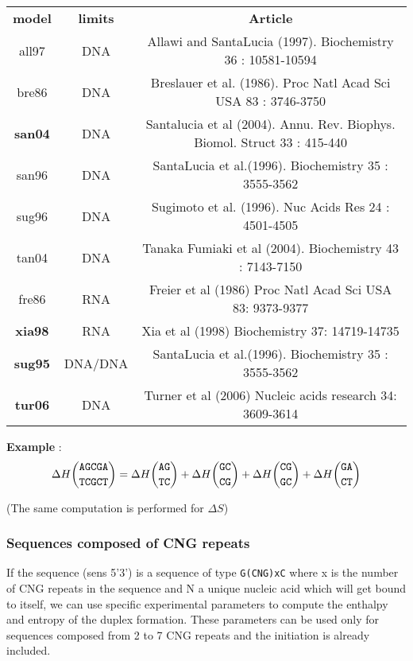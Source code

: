 \documentclass{article}
\begin{document}
\begin{table}[h]
\begin{tabular}[h]{| c | c | c |}
\textbf{model} & \textbf{limits} & \textbf{Article} \\
all97 & DNA & Allawi and SantaLucia (1997). Biochemistry 36 : 10581-10594 \\
bre86 & DNA & Breslauer et al. (1986). Proc Natl Acad Sci USA 83 : 3746-3750 \\
\textbf{san04} & DNA & Santalucia et al (2004). Annu. Rev. Biophys. Biomol. Struct 33 : 415-440 \\
san96 & DNA & SantaLucia et al.(1996). Biochemistry 35 : 3555-3562 \\
sug96 & DNA & Sugimoto et al. (1996). Nuc Acids Res 24 : 4501-4505 \\
tan04 & DNA & Tanaka Fumiaki et al (2004). Biochemistry 43 : 7143-7150  \\
fre86 & RNA & Freier et al (1986) Proc Natl Acad Sci USA 83: 9373-9377 \\
\textbf{xia98} & RNA & Xia et al (1998) Biochemistry 37: 14719-14735 \\
\textbf{sug95} & DNA/DNA & SantaLucia et al.(1996). Biochemistry 35 : 3555-3562 \\
\textbf{tur06} & DNA & Turner et al (2006) Nucleic acids research 34: 3609-3614 \\
\end{tabular}
\end{table}


\textbf{Example} :
\begin{multline*}
\Delta H {\mbox{\texttt{AGCGA}} \choose \mbox{\texttt{TCGCT}}} = 
\Delta H {\mbox{\texttt{AG}} \choose \mbox{\texttt{TC}} } + 
\Delta H {\mbox{\texttt{GC}} \choose \mbox{\texttt{CG}} } +
\Delta H {\mbox{\texttt{CG}} \choose \mbox{\texttt{GC}} } +
\Delta H {\mbox{\texttt{GA}} \choose \mbox{\texttt{CT}} }
\end{multline*}

       (The same computation is performed for $\Delta S$)
       
\subsubsection{Sequences composed of CNG repeats}

If the sequence (sens 5'3') is a sequence of type \texttt{G(CNG)xC} where x is the number of CNG repeats in
the sequence and N a unique nucleic acid which will get bound to itself, we can use specific
experimental parameters to compute the enthalpy and entropy of the duplex formation. These parameters can be used
only for sequences composed from 2 to 7 CNG repeats and the initiation is already included.
 
\end{document}
